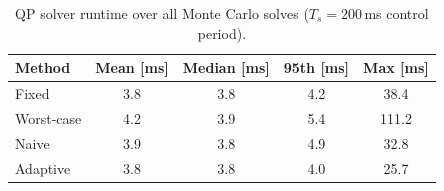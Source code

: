 \begin{table}[t]
\centering
\caption{QP solver runtime over all Monte Carlo solves ($T_s=200$\,ms control period).}
\label{tab:runtime}
\small
\begin{tabular}{lcccc}
\toprule
Method & Mean [ms] & Median [ms] & 95th [ms] & Max [ms] \\
\midrule
Fixed & 3.8 & 3.8 & 4.2 & 38.4 \\
Worst-case & 4.2 & 3.9 & 5.4 & 111.2 \\
Naive & 3.9 & 3.8 & 4.9 & 32.8 \\
Adaptive & 3.8 & 3.8 & 4.0 & 25.7 \\
\bottomrule
\end{tabular}
\end{table}